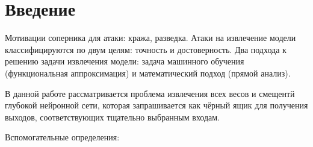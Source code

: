 \section*{Введение} 
Мотивации соперника для атаки: кража, разведка.
Атаки на извлечение модели классифицируются по двум целям: точность и достоверность.
Два подхода к решению задачи извлечения модели: задача машинного обучения (функциональная аппроксимация) и математический подход (прямой анализ).

В данной работе рассматривается проблема извлечения всех весов и смещентй глубокой нейронной сети, которая запрашивается как чёрный ящик для получения выходов, соответствующих тщательно выбранным входам.

Вспомогательные определения:

